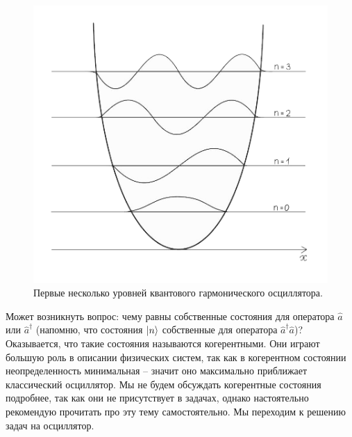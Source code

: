 \begin{figure}[!ht]
\centering
\includegraphics[scale=0.4]{class_6/images/oscillator.png}
\caption{Первые несколько уровней квантового гармонического осциллятора.}
\label{fig 6.8}
\end{figure}
\newpage
Может возникнуть вопрос: чему равны собственные состояния для оператора $\hat{a}$ или $\hat{a}^{\dagger}$ (напомню, что состояния $\ket{n}$ собственные для оператора $\hat{a}^{\dagger}\hat{a}$)? Оказывается, что такие состояния называются когерентными. Они играют большую роль в описании физических систем, так как в когерентном состоянии неопределенность минимальная – значит оно максимально приближает классический осциллятор. Мы не будем обсуждать когерентные состояния подробнее, так как они не присутствует в задачах, однако настоятельно рекомендую прочитать про эту тему самостоятельно. Мы переходим к решению задач на осциллятор.


